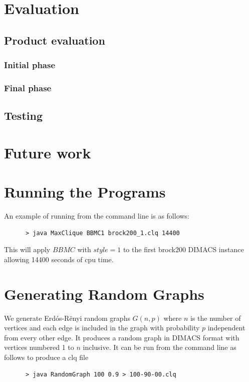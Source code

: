 \documentclass{l4proj}
\begin{document}
\chapter{Evaluation}

\section{Product evaluation}

\subsection{Initial phase}

\subsection{Final phase}

\section{Testing}

\chapter{Future work}

\begin{appendices}

\chapter{Running the Programs}
An example of running from the command line is as follows:
\begin{verbatim}
      > java MaxClique BBMC1 brock200_1.clq 14400
\end{verbatim}
This will apply $BBMC$ with $style = 1$ to the first brock200 DIMACS instance allowing 14400 seconds of cpu time.

\chapter{Generating Random Graphs}
\label{sec:randomGraph}
We generate Erd\'{o}s-R\"{e}nyi random graphs $G(n,p)$ where $n$ is the number of vertices and
each edge is included in the graph with probability $p$ independent from every other edge. It produces
a random graph in DIMACS format with vertices numbered 1 to $n$ inclusive. It can be run from the command line as follows to produce 
a clq file
\begin{verbatim}
      > java RandomGraph 100 0.9 > 100-90-00.clq
\end{verbatim}
\end{appendices}




\end{document}
